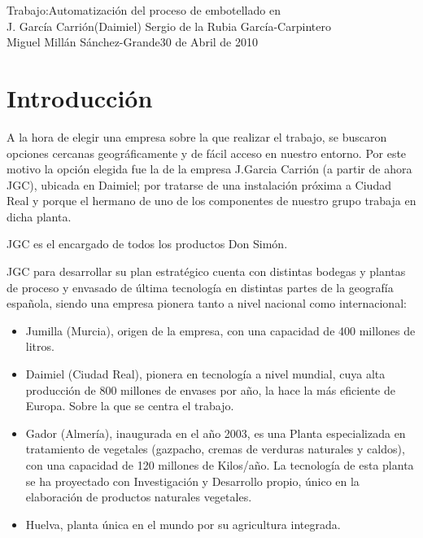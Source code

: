 \documentclass[11pt,a4paper,spanish,twoside]{report}
\begin{document}


{Trabajo:}{Automatización del proceso de embotellado en\\ J. García Carrión(Daimiel)}
{Sergio de la Rubia García-Carpintero\\Miguel Millán Sánchez-Grande}{30 de Abril de 2010}


\tableofcontents


\chapter{Introducción}
A la hora de elegir una empresa sobre la que realizar el trabajo, se buscaron
opciones cercanas geográficamente y de fácil acceso en nuestro entorno. Por
este motivo la opción elegida fue la de la empresa J.Garcia Ca\-rrión (a partir
de ahora JGC), ubicada en Daimiel; por tratarse de una instalación próxima 
a Ciudad Real y porque el hermano de uno de los componentes de nuestro grupo
trabaja en dicha planta.

JGC es el encargado de todos los productos Don Simón. 

JGC para desarrollar su plan estratégico cuenta con distintas bodegas y plantas
de proceso y envasado de última tecnología en distintas partes de la
geografía española, siendo una empresa pionera tanto a nivel nacional como
internacional:

\begin{itemize}
\item Jumilla (Murcia), origen de la empresa, con una capacidad de 400
  millones de litros. 
\item Daimiel (Ciudad Real), pionera en tecnología a nivel mundial, cuya alta
  producción de 800 millones de envases por año, la hace la más eficiente de
  Europa. Sobre la que se centra el trabajo.  
\item Gador (Almería), inaugurada en el año 2003, es una Planta especia\-li\-za\-da
  en tratamiento de vegetales (gazpacho, cremas de verduras na\-tu\-ra\-les y
  caldos), con una capacidad de 120 millones de Kilos/año. La tecnología de
  esta planta se ha proyectado con Investigación y Desarrollo propio, único
  en la elaboración de productos naturales vegetales. 
\item Huelva, planta única en el mundo por su agricultura integrada. 
\end{itemize}
\end{document}
